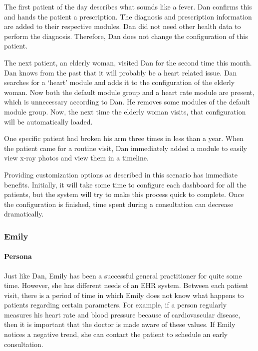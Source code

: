         The first patient of the day describes what sounds like a fever. Dan confirms this and hands the patient a prescription. The diagnosis and prescription information are added to their respective modules. Dan did not need other health data to perform the diagnosis. Therefore, Dan does not change the configuration of this patient.

        The next patient, an elderly woman, visited Dan for the second time this month. Dan knows from the past that it will probably be a heart related issue. Dan searches for a `heart' module and adds it to the configuration of the elderly woman. Now both the default module group and a heart rate module are present, which is unnecessary according to Dan. He removes some modules of the default module group. Now, the next time the elderly woman visits, that configuration will be automatically loaded.

        One specific patient had broken his arm three times in less than a year. When the patient came for a routine visit, Dan immediately added a module to easily view x-ray photos and view them in a timeline.\bigskip

        \noindent Providing customization options as described in this scenario has immediate benefits. Initially, it will take some time to configure each dashboard for all the patients, but the system will try to make this process quick to complete. Once the configuration is finished, time spent during a consultation can decrease dramatically.
        
        \subsubsection{Emily}

        \paragraph{Persona} Just like Dan, Emily has been a successful general practitioner for quite some time. However, she has different needs of an EHR system. Between each patient visit, there is a period of time in which Emily does not know what happens to patients regarding certain parameters. For example, if a person regularly measures his heart rate and blood pressure because of cardiovascular disease, then it is important that the doctor is made aware of these values. If Emily notices a negative trend, she can contact the patient to schedule an early consultation.
        
